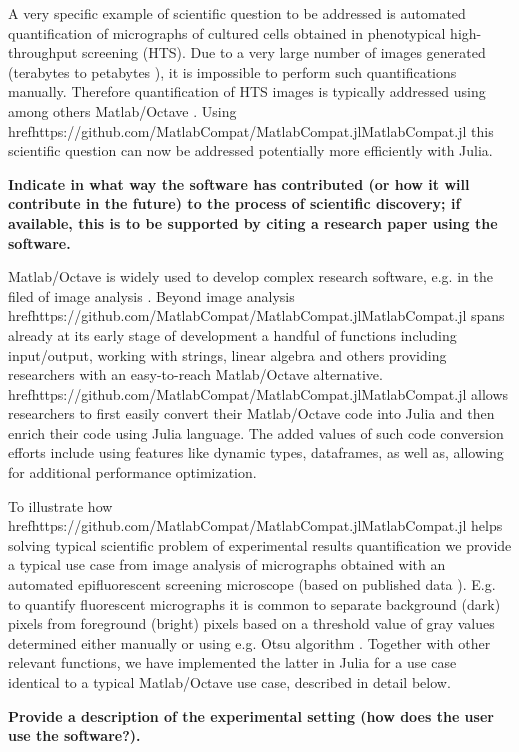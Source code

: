 A very specific example of scientific question to be addressed is automated quantification of micrographs of cultured cells obtained in phenotypical high-throughput screening (HTS). Due to a very large number of images generated (terabytes to petabytes \cite{R_m__2014}), it is impossible to perform such quantifications manually. Therefore quantification of HTS images is typically addressed using among others Matlab/Octave \cite{22787215, 17076895, R_m__2014}. Using href{https://github.com/MatlabCompat/MatlabCompat.jl}{MatlabCompat.jl} this scientific question can now be addressed potentially more efficiently with Julia.

\textbf{Indicate in what way the software has contributed (or how it will contribute in the future) to the process of scientific discovery; if available, this is to be supported by citing a research paper using the software.}

Matlab/Octave is widely used to develop complex research software, e.g. in the filed of image analysis \cite{Kiss_2014, 17076895}. Beyond image analysis href{https://github.com/MatlabCompat/MatlabCompat.jl}{MatlabCompat.jl} spans already at its early stage of development a handful of functions including input/output, working with strings, linear algebra and others providing researchers with an easy-to-reach Matlab/Octave alternative. href{https://github.com/MatlabCompat/MatlabCompat.jl}{MatlabCompat.jl} allows researchers to first easily convert their Matlab/Octave code into Julia and then enrich their code using Julia language. The added values of such code conversion efforts include using features like dynamic types, dataframes, as well as, allowing for additional performance optimization.

To illustrate how href{https://github.com/MatlabCompat/MatlabCompat.jl}{MatlabCompat.jl} helps solving typical scientific problem of experimental results quantification we provide a typical use case from image analysis of micrographs obtained with an automated epifluorescent screening microscope (based on published data \cite{22787215}). E.g. to quantify fluorescent micrographs it is common to separate background (dark) pixels from foreground (bright) pixels based on a threshold value of gray values determined either manually or using e.g. Otsu algorithm \cite{otsu1975threshold}. Together with other relevant functions, we have implemented the latter in Julia for a use case identical to a typical Matlab/Octave use case, described in detail below.

\textbf{Provide a description of the experimental setting (how does the user use the software?).}

